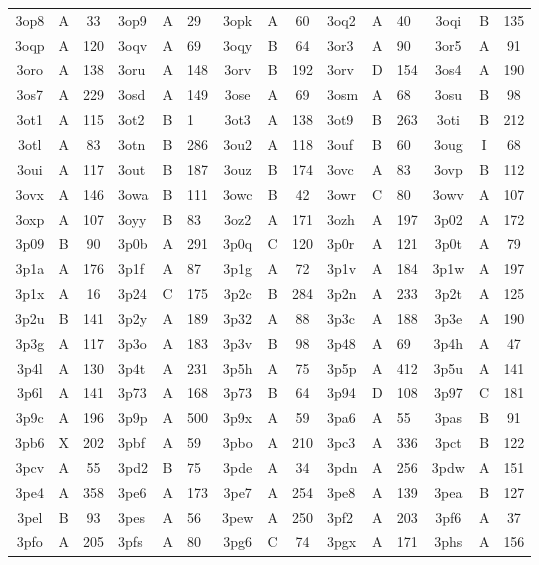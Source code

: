 \begin{longtable}{|c|c|c| a|a|a| c|c|c| a|a|a| c|c|c|}
3op8 & A & 33 & 3op9 & A & 29 & 3opk & A & 60 & 3oq2 & A & 40 & 3oqi & B & 135\\
3oqp & A & 120 & 3oqv & A & 69 & 3oqy & B & 64 & 3or3 & A & 90 & 3or5 & A & 91\\
3oro & A & 138 & 3oru & A & 148 & 3orv & B & 192 & 3orv & D & 154 & 3os4 & A & 190\\
3os7 & A & 229 & 3osd & A & 149 & 3ose & A & 69 & 3osm & A & 68 & 3osu & B & 98\\
3ot1 & A & 115 & 3ot2 & B & 1 & 3ot3 & A & 138 & 3ot9 & B & 263 & 3oti & B & 212\\
3otl & A & 83 & 3otn & B & 286 & 3ou2 & A & 118 & 3ouf & B & 60 & 3oug & I & 68\\
3oui & A & 117 & 3out & B & 187 & 3ouz & B & 174 & 3ovc & A & 83 & 3ovp & B & 112\\
3ovx & A & 146 & 3owa & B & 111 & 3owc & B & 42 & 3owr & C & 80 & 3owv & A & 107\\
3oxp & A & 107 & 3oyy & B & 83 & 3oz2 & A & 171 & 3ozh & A & 197 & 3p02 & A & 172\\
3p09 & B & 90 & 3p0b & A & 291 & 3p0q & C & 120 & 3p0r & A & 121 & 3p0t & A & 79\\
3p1a & A & 176 & 3p1f & A & 87 & 3p1g & A & 72 & 3p1v & A & 184 & 3p1w & A & 197\\
3p1x & A & 16 & 3p24 & C & 175 & 3p2c & B & 284 & 3p2n & A & 233 & 3p2t & A & 125\\
3p2u & B & 141 & 3p2y & A & 189 & 3p32 & A & 88 & 3p3c & A & 188 & 3p3e & A & 190\\
3p3g & A & 117 & 3p3o & A & 183 & 3p3v & B & 98 & 3p48 & A & 69 & 3p4h & A & 47\\
3p4l & A & 130 & 3p4t & A & 231 & 3p5h & A & 75 & 3p5p & A & 412 & 3p5u & A & 141\\
3p6l & A & 141 & 3p73 & A & 168 & 3p73 & B & 64 & 3p94 & D & 108 & 3p97 & C & 181\\
3p9c & A & 196 & 3p9p & A & 500 & 3p9x & A & 59 & 3pa6 & A & 55 & 3pas & B & 91\\
3pb6 & X & 202 & 3pbf & A & 59 & 3pbo & A & 210 & 3pc3 & A & 336 & 3pct & B & 122\\
3pcv & A & 55 & 3pd2 & B & 75 & 3pde & A & 34 & 3pdn & A & 256 & 3pdw & A & 151\\
3pe4 & A & 358 & 3pe6 & A & 173 & 3pe7 & A & 254 & 3pe8 & A & 139 & 3pea & B & 127\\
3pel & B & 93 & 3pes & A & 56 & 3pew & A & 250 & 3pf2 & A & 203 & 3pf6 & A & 37\\
3pfo & A & 205 & 3pfs & A & 80 & 3pg6 & C & 74 & 3pgx & A & 171 & 3phs & A & 156\\

\end{longtable}
